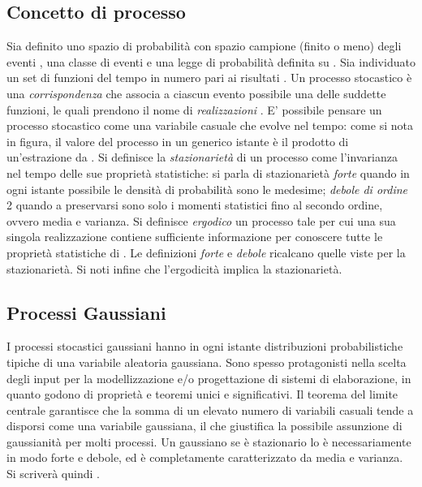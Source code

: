 	\subsection{Concetto di processo}
Sia definito uno spazio di probabilità con  
spazio campione (finito o meno) degli eventi ,  una classe di eventi e  una legge di probabilità definita su . Sia individuato un set di funzioni del tempo  in numero pari ai risultati . Un processo stocastico  è una {\em corrispondenza} che associa a ciascun evento possibile una delle suddette funzioni, le quali prendono il nome di {\em realizzazioni} \cite{TDS:HILL}.
E' possibile pensare un processo stocastico come una variabile casuale  che evolve nel tempo: come si nota in figura, il valore del processo in un generico istante  è il prodotto di un'estrazione da .
Si definisce la {\em stazionarietà} di un processo come l'invarianza nel tempo delle sue proprietà statistiche: si parla di stazionarietà {\em forte} quando in ogni istante possibile le densità di probabilità sono le medesime; {\em debole di ordine} 2 quando a preservarsi sono solo i momenti statistici fino al secondo ordine, ovvero media e varianza.
Si definisce {\em ergodico} un processo  tale per cui una sua singola realizzazione contiene sufficiente informazione per conoscere tutte le proprietà statistiche di . Le definizioni {\em forte} e {\em debole} ricalcano quelle viste per la stazionarietà. Si noti infine che l'ergodicità implica la stazionarietà.
	\subsection{Processi Gaussiani}
I processi stocastici gaussiani hanno in ogni istante distribuzioni probabilistiche tipiche di una variabile aleatoria gaussiana. Sono spesso protagonisti nella scelta degli input per la modellizzazione e/o progettazione di sistemi di elaborazione, in quanto godono di proprietà e teoremi unici e significativi. Il teorema del limite centrale garantisce che la somma di un elevato numero di variabili casuali tende a disporsi come una variabile gaussiana, il che giustifica la possibile assunzione di gaussianità per molti processi. Un gaussiano se è stazionario lo è necessariamente in modo forte e debole, ed è completamente caratterizzato da media e varianza. Si scriverà quindi .
